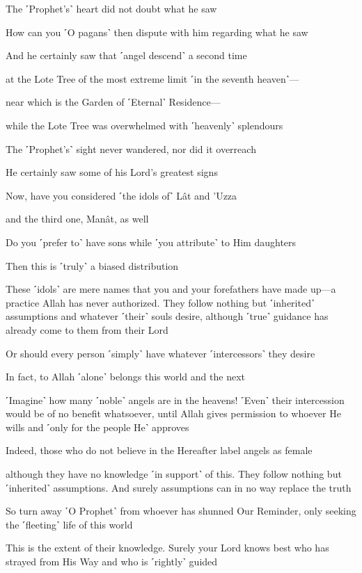 The ˹Prophet’s˺ heart did not doubt what he saw

How can you ˹O pagans˺ then dispute with him regarding what he saw

And he certainly saw that ˹angel descend˺ a second time

at the Lote Tree of the most extreme limit ˹in the seventh heaven˺—

near which is the Garden of ˹Eternal˺ Residence—

while the Lote Tree was overwhelmed with ˹heavenly˺ splendours

The ˹Prophet’s˺ sight never wandered, nor did it overreach

He certainly saw some of his Lord’s greatest signs

Now, have you considered ˹the idols of˺ Lât and ’Uzza

and the third one, Manât, as well

Do you ˹prefer to˺ have sons while ˹you attribute˺ to Him daughters

Then this is ˹truly˺ a biased distribution

These ˹idols˺ are mere names that you and your forefathers have made up—a practice Allah has never authorized. They follow nothing but ˹inherited˺ assumptions and whatever ˹their˺ souls desire, although ˹true˺ guidance has already come to them from their Lord

Or should every person ˹simply˺ have whatever ˹intercessors˺ they desire

In fact, to Allah ˹alone˺ belongs this world and the next

˹Imagine˺ how many ˹noble˺ angels are in the heavens! ˹Even˺ their intercession would be of no benefit whatsoever, until Allah gives permission to whoever He wills and ˹only for the people He˺ approves

Indeed, those who do not believe in the Hereafter label angels as female

although they have no knowledge ˹in support˺ of this. They follow nothing but ˹inherited˺ assumptions. And surely assumptions can in no way replace the truth

So turn away ˹O Prophet˺ from whoever has shunned Our Reminder, only seeking the ˹fleeting˺ life of this world

This is the extent of their knowledge. Surely your Lord knows best who has strayed from His Way and who is ˹rightly˺ guided

